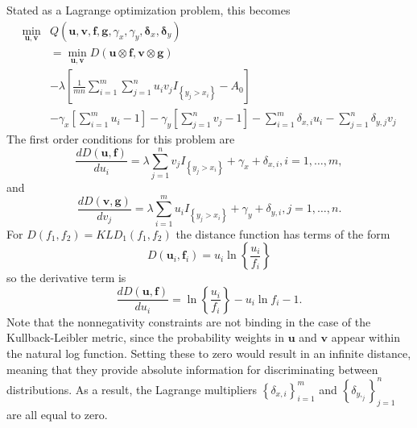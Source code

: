Stated as a Lagrange optimization problem, this becomes
\begin{align}
    \min_{\mathbf{u},\mathbf{v}} & Q(\mathbf{u},\mathbf{v}, \mathbf{f},\mathbf{g},
    \gamma_x,\gamma_y,\mathbf{\delta}_{x},\mathbf{\delta}_{y}) \\
    & = \min_{\mathbf{u},\mathbf{v}}
        D(\mathbf{u} \otimes \mathbf{f}, \mathbf{v} \otimes \mathbf{g}) \\
    &           - \lambda \left[ \frac{1}{m n} \sum_{i = 1}^{m} \sum_{j = 1}^{n} u_i v_j I_{\left\{ y_j > x_i \right\}} - A_0 \right] \\
    &           - \gamma_x \left[ \sum_{i = 1}^{m} u_i - 1 \right]
                - \gamma_y \left[ \sum_{j = 1}^{n} v_j - 1 \right]
                - \sum_{i = 1}^{m} \delta_{x,i} u_i
                - \sum_{j = 1}^{n} \delta_{y,j} v_j
\end{align}
%
\noindent The first order conditions for this problem are
\begin{equation}
    \frac{d D(\mathbf{u},\mathbf{f})}{d u_i} = \lambda \sum_{j = 1}^{n} v_j I_{\left\{ y_j > x_i \right\}} + \gamma_x + \delta_{x,i},
    i = 1, \dots, m,
\end{equation}
and
\begin{equation}
    \frac{d D(\mathbf{v},\mathbf{g})}{d v_j} = \lambda \sum_{i = 1}^{m} u_i I_{\left\{ y_j > x_i \right\}} + \gamma_y + \delta_{y,i},
    j = 1, \dots, n.
\end{equation}
%
%
\noindent For $D(f_1, f_2) = KLD_1(f_1, f_2)$ the distance function has terms of the form
\begin{equation}
    D(\mathbf{u}_i, \mathbf{f}_i) = u_i \ln \left\{ \frac{u_i}{f_i} \right\}
\end{equation}
\noindent so the derivative term is
\begin{equation}
    \frac{d D(\mathbf{u},\mathbf{f})}{d u_i} = \ln \left\{ \frac{u_i}{f_i} \right\} - u_i\ln f_i - 1.
\end{equation}
%
%
Note that the nonnegativity constraints are not binding in the case of the Kullback-Leibler metric,
since the probability weights in $\mathbf{u}$ and $\mathbf{v}$ appear within the natural log function.
Setting these to zero would result in an infinite distance,
meaning that they provide absolute information for discriminating between distributions.
As a result, the Lagrange multipliers $\left\{ \delta_{x,i} \right\}_{i=1}^{m}$ and $\left\{ \delta_{y,_j} \right\}_{j=1}^{n}$ are all equal to zero.

